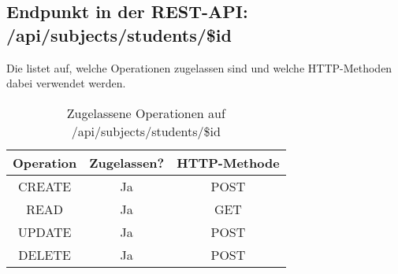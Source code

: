 \subsection{Endpunkt in der REST-API: /api/subjects/students/\$id}
Die  listet auf, welche Operationen zugelassen sind und welche HTTP-Methoden dabei verwendet werden. 

\begin{table}[!htbp]
	\begin{tabular}{|c|c|c|}
		\hline
			\textbf{Operation} & \textbf{Zugelassen?} & \textbf{HTTP-Methode} \\ \hline
			CREATE & Ja & POST \\ \hline 
			READ & Ja & GET \\ \hline
			UPDATE & Ja & POST \\ \hline 
			DELETE & Ja & POST \\ \hline
	\end{tabular}

		\caption{Zugelassene Operationen auf /api/subjects/students/\$id}
		\label{tab:end:rest:api:subjects:students:id:meth}
\end{table}
